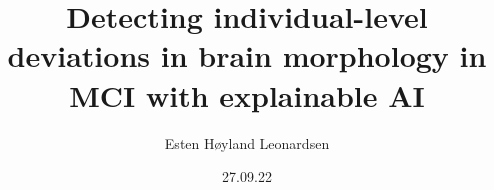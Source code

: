 \documentclass[t]{beamer}
\author{Esten H{\o}yland Leonardsen}
\institute[Life Science, UiO]{UiO:Life Science, University of Oslo}
\date{27.09.22}
\title{Detecting individual-level deviations in brain morphology in MCI with explainable AI}
\begin{document}
	\newcommand{\N}{1}

	\newcommand{\nodesize}{11pt}
	\newcommand{\hsep}{28pt}
	\newcommand{\vsep}{14pt}

	\newcommand{\arrowwidth}{0.05cm}
	\newcommand{\innerarrow}{{Latex[length=0.1cm, width=0.15cm]}}
	\newcommand{\outerarrow}{{Latex[length=0.2cm, width=0.3cm]}}

	\def\plotwidth{11.68}







\end{document}
